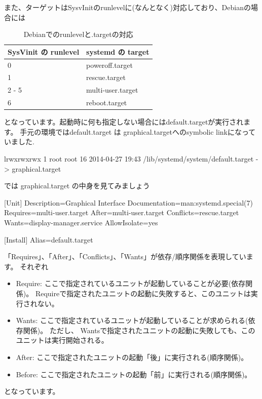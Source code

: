 \documentclass[mingoth,a4paper]{jsarticle}
\begin{document}
また、ターゲットはSysvInitのrunlevelに(なんとなく)対応しており、Debianの場合には
\begin{table}[h]
  \centering
  \begin{tabular}{l|l}
    SysVinit の runlevel & systemd の target \\
    \hline
    0                    & poweroff.target \\
    1                    & rescue.target \\
    2 - 5                & multi-user.target \\
    6                    & reboot.target \\
    \hline
  \end{tabular}
  \caption{Debianでのrunlevelと.targetの対応}
\end{table}
となっています。起動時に何も指定しない場合にはdefault.targetが実行されます。
手元の環境ではdefault.target は graphical.targetへのsymbolic linkになっていました.
\begin{commandline}
  lrwxrwxrwx 1 root root 16 2014-04-27 19:43 /lib/systemd/system/default.target -> graphical.target
\end{commandline}
では graphical.target の中身を見てみましょう
\begin{commandline}

[Unit]
Description=Graphical Interface
Documentation=man:systemd.special(7)
Requires=multi-user.target
After=multi-user.target
Conflicts=rescue.target
Wants=display-manager.service
AllowIsolate=yes

[Install]
Alias=default.target

\end{commandline}
「Requires」、「After」、「Conflicts」、「Wants」が依存/順序関係を表現しています。
それぞれ
\begin{itemize}
\item Require: ここで指定されているユニットが起動していることが必要(依存関係)。
  Requireで指定されたユニットの起動に失敗すると、このユニットは実行されない。
\item Wants: ここで指定されているユニットが起動していることが求められる(依存関係)。
  ただし、
  Wantsで指定されたユニットの起動に失敗しても、このユニットは実行開始される。
\item After: ここで指定されたユニットの起動「後」に実行される(順序関係)。
\item Before: ここで指定されたユニットの起動「前」に実行される(順序関係)。
\end{itemize}
となっています。
\end{document}
